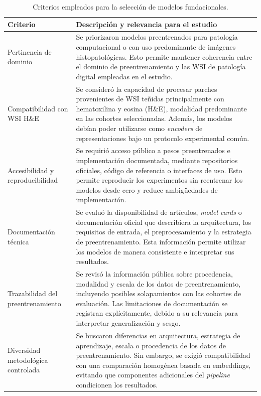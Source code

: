 \begin{table}[htbp]
\centering
\caption{Criterios empleados para la selección de modelos fundacionales.}
\label{tab:criterios_seleccion_modelos}
\small
\renewcommand{\arraystretch}{1.12}
\begin{tabular}{p{3.7cm} p{10.3cm}}
\toprule
\textbf{Criterio} & \textbf{Descripción y relevancia para el estudio} \\
\midrule

Pertinencia de dominio &
Se priorizaron modelos preentrenados para patología computacional o con uso predominante de imágenes histopatológicas. Esto permite mantener coherencia entre el dominio de preentrenamiento y las WSI de patología digital empleadas en el estudio. \\

Compatibilidad con WSI H\&E &
Se consideró la capacidad de procesar parches provenientes de WSI teñidas principalmente con hematoxilina y eosina (H\&E), modalidad predominante en las cohortes seleccionadas. Además, los modelos debían poder utilizarse como \textit{encoders} de representaciones bajo un protocolo experimental común. \\

Accesibilidad y reproducibilidad &
Se requirió acceso público a pesos preentrenados e implementación documentada, mediante repositorios oficiales, código de referencia o interfaces de uso. Esto permite reproducir los experimentos sin reentrenar los modelos desde cero y reduce ambigüedades de implementación. \\

Documentación técnica &
Se evaluó la disponibilidad de artículos, \textit{model cards} o documentación oficial que describiera la arquitectura, los requisitos de entrada, el preprocesamiento y la estrategia de preentrenamiento. Esta información permite utilizar los modelos de manera consistente e interpretar sus resultados. \\

Trazabilidad del preentrenamiento &
Se revisó la información pública sobre procedencia, modalidad y escala de los datos de preentrenamiento, incluyendo posibles solapamientos con las cohortes de evaluación. Las limitaciones de documentación se registran explícitamente, debido a su relevancia para interpretar generalización y sesgo. \\

Diversidad metodológica controlada &
Se buscaron diferencias en arquitectura, estrategia de aprendizaje, escala o procedencia de los datos de preentrenamiento. Sin embargo, se exigió compatibilidad con una comparación homogénea basada en embeddings, evitando que componentes adicionales del \textit{pipeline} condicionen los resultados. \\


\end{tabular}
\end{table}
